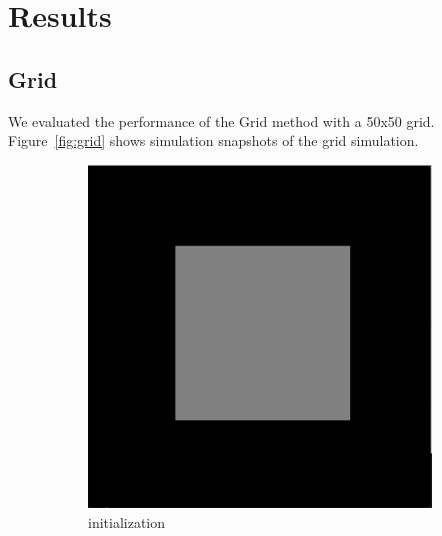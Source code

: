 \section{Results}

\subsection{Grid}

We evaluated the performance of the Grid method with a 50x50 grid. Figure~\ref{fig:grid} shows simulation snapshots of the grid simulation.

\begin{figure}[h]
    \centering
    \begin{subfigure}[b]{0.2\textwidth}
        \includegraphics[width=\textwidth]{figures/grid50_init.png}
        \caption{initialization}
    \end{subfigure}
    \hspace{1em}
    \begin{subfigure}[b]{0.2\textwidth}

\end{subfigure}
\end{figure}
